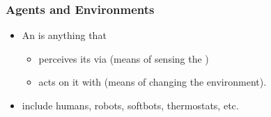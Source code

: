\documentclass[notes,mh]{mikoslides}
\begin{document}
\begin{module}[id=agentenv]
\begin{frame}[label=slide.agentenv]
  \frametitle{Agents and Environments}
  \begin{itemize}
  \item
    \begin{definition}
      An  is anything that
      \begin{itemize}
      \item perceives its  via  (means of sensing the
        )
      \item acts on it with  (means of changing the environment).
      \end{itemize}
    \end{definition}
  \item
    \begin{example}
       include humans, robots, softbots, thermostats, etc.
    \end{example}
  \end{itemize}
\end{frame}
\end{module}
\end{document}
